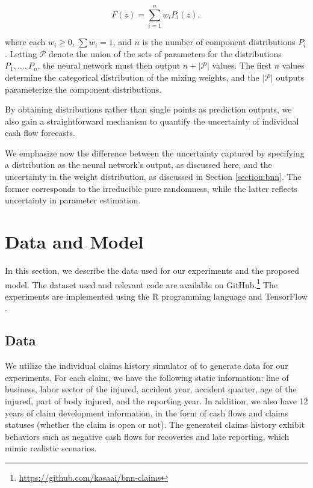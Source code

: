 \documentclass{article}
\begin{document}
\begin{equation}
    F(z) = \sum_{i = 1}^n w_i P_i(z),
\end{equation}

where each $w_i \geq 0$, $\sum w_i = 1$, and $n$ is the number of component 
distributions $P_i$. Letting $\mathcal{P}$ denote the union of the sets of 
parameters for the distributions $P_1, \dots, P_n$, the neural network must then
output $n + |\mathcal{P}|$ values. The first $n$ values determine the 
categorical distribution of the mixing weights, and the $|\mathcal{P}|$ outputs
parameterize the component distributions.

By obtaining distributions rather than single points as prediction outputs, we
also gain a straightforward mechanism to quantify the uncertainty of individual
cash flow forecasts.

We emphasize now the difference between the uncertainty captured by specifying a
distribution as the neural network's output, as discussed here, and the 
uncertainty in the weight distribution, as discussed in Section 
\ref{section:bnn}. The former corresponds to the irreducible pure randomness,
while the latter reflects uncertainty in parameter estimation.

\section{Data and Model}

In this section, we describe the data used for our experiments and the proposed
model. The dataset used and relevant code are available on 
GitHub.\footnote{\url{https://github.com/kasaai/bnn-claims}} The experiments are
implemented using the R programming language 
\cite{rdevelopmentcoreteamLanguageEnvironment2011} and TensorFlow 
\cite{tensorflow2015-whitepaper}.

\subsection{Data}

We utilize the individual claims history simulator of 
\cite{gabrielliIndividualClaims2018} to generate data for our experiments. For 
each claim, we have the following static information: line of business, labor 
sector of the injured, accident year, accident quarter, age of the injured, part
of body injured, and the reporting year. In addition, we also have 12 years of 
claim development information, in the form of cash flows and claims statuses 
(whether the claim is open or not). The generated claims history exhibit 
behaviors such as negative cash flows for recoveries and late reporting, which 
mimic realistic scenarios.
\end{document}
